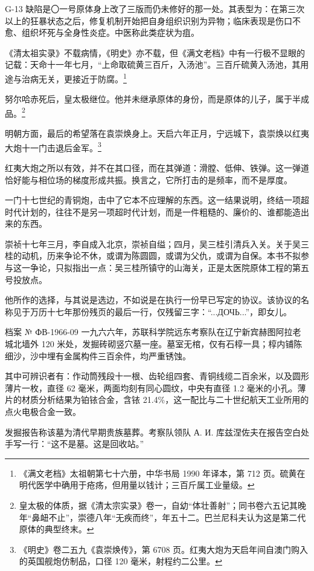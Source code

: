 G-13 缺陷是〇一号原体身上改了三版而仍未修好的那一处。其表型为：在第三次以上的狂暴状态之后，修复机制开始把自身组织识别为异物；临床表现是伤口不愈、组织坏死与全身性炎症。中医称此类症状为疽。

《清太祖实录》不载病情，《明史》亦不载，但《满文老档》中有一行极不显眼的记载：天命十一年七月，“上命取硫黄三百斤，入汤池”。三百斤硫黄入汤池，其用途与治病无关，更接近于防腐。\footnote{《满文老档》太祖朝第七十六册，中华书局 1990 年译本，第 712 页。硫黄在明代医学中确用于疮疡，但用量以钱计；三百斤属工业量级。}

努尔哈赤死后，皇太极继位。他并未继承原体的身份，而是原体的儿子，属于半成品。\footnote{皇太极的体质，据《清太宗实录》卷一，自幼“体壮善射”；同书卷六五记其晚年“鼻衄不止”，崇德八年“无疾而终”，年五十二。巴兰尼科夫认为这是第二代原体的典型终末。}

明朝方面，最后的希望落在袁崇焕身上。天启六年正月，宁远城下，袁崇焕以红夷大炮十一门击退后金军。\footnote{《明史》卷二五九《袁崇焕传》，第 6708 页。红夷大炮为天启年间自澳门购入的英国舰炮仿制品，口径 120 毫米，射程约二公里。}

红夷大炮之所以有效，并不在其口径，而在其弹道：滑膛、低伸、铁弹。这一弹道恰好能与相位场的梯度形成共振。换言之，它所打击的是频率，而不是厚度。

一门十七世纪的青铜炮，击中了它本不应理解的东西。这一结果说明，终结一项超时代计划的，往往不是另一项超时代计划，而是一件粗糙的、廉价的、谁都能造出来的东西。

崇祯十七年三月，李自成入北京，崇祯自缢；四月，吴三桂引清兵入关。关于吴三桂的动机，历来争论不休，或谓为陈圆圆，或谓为父仇，或谓为自保。本书不拟参与这一争论，只拟指出一点：吴三桂所镇守的山海关，正是太医院原体工程的第五号投放点。

他所作的选择，与其说是选边，不如说是在执行一份早已写定的协议。该协议的名称见于万历十七年那份残页的最后一行，仅残留三字：“...ДОЧЬ...”，即女儿。

\begin{archive}{档案 № ФВ-1966-09}
一九六六年，苏联科学院远东考察队在辽宁新宾赫图阿拉老城北墙外 120 米处，发掘砖砌竖穴墓一座。墓室无棺，仅有石椁一具；椁内铺陈细沙，沙中埋有金属构件三百余件，均严重锈蚀。

其中可辨识者有：作动筒残段十一根、齿轮组四套、青铜线缆二百余米，以及圆形薄片一枚，直径 62 毫米，两面均刻有同心圆纹，中央有直径 1.2 毫米的小孔。薄片的材质分析结果为铂铱合金，含铱 21.4\%，这一配比与二十世纪航天工业所用的点火电极合金一致。

发掘报告称该墓为清代早期贵族墓葬。考察队领队 А. И. 库兹涅佐夫在报告空白处手写一行：“这不是墓。这是回收站。”
\end{archive}

